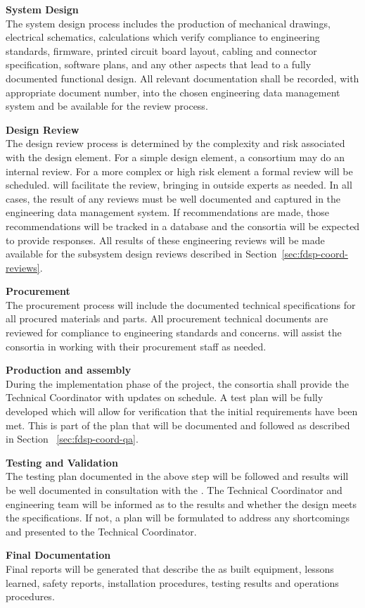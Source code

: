 {\bf System Design}\\
The system design process includes the production of mechanical
drawings, electrical schematics, calculations which verify compliance
to engineering standards, firmware, printed circuit board layout,
cabling and connector specification, software plans, and any other
aspects that lead to a fully documented functional design.  All
relevant documentation shall be recorded, with appropriate document
number, into the chosen engineering data management system and be
available for the review process.

{\bf Design Review}\\ The design review process is determined by the
complexity and risk associated with the design element.  For a simple
design element, a consortium may do an internal review.  For a more
complex or high risk element a formal review will be scheduled.
  will facilitate the review,
bringing in outside experts as needed.  In all cases, the result of
any reviews must be well documented and captured in the engineering
data management system.  If recommendations are made, those
recommendations will be tracked in a database and the consortia will
be expected to provide responses. All results of these engineering
reviews will be made available for the subsystem design reviews
described in Section~\ref{sec:fdsp-coord-reviews}.

{\bf Procurement}\\ The procurement process will include the
documented technical specifications for all procured materials and
parts.  All procurement technical documents are reviewed for
compliance to engineering standards and  concerns.
  will assist the consortia in working with
their procurement staff as needed.

{\bf Production and assembly}\\ During the implementation phase of the project,
the consortia shall provide the Technical Coordinator with updates on
schedule.  A test plan will be fully developed which will allow for
verification that the initial requirements have been met. This is part of
the  plan that will be documented and followed as described
in Section ~\ref{sec:fdsp-coord-qa}.

{\bf Testing and Validation\\} The testing plan documented in the
above step will be followed and results will be well documented in
consultation with the .  The Technical Coordinator and 
engineering team will be informed as to the results and whether the
design meets the specifications.  If not, a plan will be formulated to
address any shortcomings and presented to the Technical Coordinator.

{\bf Final Documentation\\} Final reports will be generated that
describe the as built equipment, lessons learned, safety reports,
installation procedures, testing results and operations procedures.
